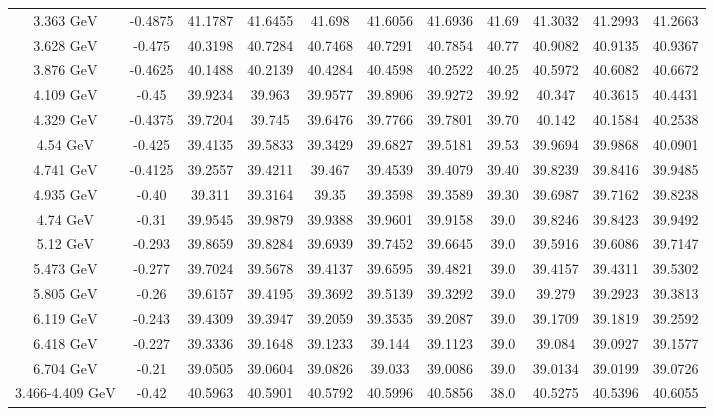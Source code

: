 \documentclass[11pt]{article}
\begin{document}
\begin{table}[htbp]
{\begin{tabular}{ccccccccccc}
				3.363 ${\textrm{GeV}}$ & -0.4875  & 41.1787 & 41.6455 & 41.698 & 41.6056 & 41.6936 & 41.69   & 41.3032 & 41.2993 & 41.2663 \\
				3.628 ${\textrm{GeV}}$ & -0.475  & 40.3198 & 40.7284 & 40.7468 & 40.7291 & 40.7854 & 40.77  & 40.9082 & 40.9135 & 40.9367 \\
				3.876 ${\textrm{GeV}}$ & -0.4625  & 40.1488 & 40.2139 & 40.4284 & 40.4598 & 40.2522 & 40.25  & 40.5972 & 40.6082 & 40.6672 \\
				4.109 ${\textrm{GeV}}$ & -0.45  & 39.9234 & 39.963 & 39.9577 & 39.8906 & 39.9272 & 39.92  & 40.347 & 40.3615 & 40.4431 \\
				4.329 ${\textrm{GeV}}$ & -0.4375  & 39.7204 & 39.745 & 39.6476 & 39.7766 & 39.7801 & 39.70  & 40.142 & 40.1584 & 40.2538 \\
				4.54 ${\textrm{GeV}}$ & -0.425  & 39.4135 & 39.5833 & 39.3429 & 39.6827 & 39.5181 & 39.53   & 39.9694 & 39.9868 & 40.0901 \\
				4.741 ${\textrm{GeV}}$ & -0.4125  & 39.2557 & 39.4211 & 39.467 & 39.4539 & 39.4079 & 39.40  & 39.8239 & 39.8416 & 39.9485 \\
				4.935 ${\textrm{GeV}}$ & -0.40  & 39.311 & 39.3164 & 39.35 & 39.3598 & 39.3589 & 39.30  & 39.6987  & 39.7162 & 39.8238 \\
				\midrule
				4.74 ${\textrm{GeV}}$ & -0.31 & 39.9545 & 39.9879 & 39.9388 & 39.9601 & 39.9158 & 39.0  & 39.8246 & 39.8423 & 39.9492 \\
				5.12 ${\textrm{GeV}}$ & -0.293 & 39.8659 & 39.8284 & 39.6939 & 39.7452 & 39.6645 & 39.0   & 39.5916 & 39.6086 & 39.7147 \\
				5.473 ${\textrm{GeV}}$ & -0.277 & 39.7024 & 39.5678 & 39.4137 & 39.6595 & 39.4821 & 39.0  & 39.4157  & 39.4311 & 39.5302 \\
				5.805 ${\textrm{GeV}}$ & -0.26 & 39.6157 & 39.4195 & 39.3692 & 39.5139 & 39.3292 & 39.0  & 39.279  & 39.2923 & 39.3813 \\
				6.119 ${\textrm{GeV}}$ & -0.243 & 39.4309 & 39.3947 & 39.2059 & 39.3535 & 39.2087 & 39.0  & 39.1709 & 39.1819 & 39.2592 \\
				6.418 ${\textrm{GeV}}$ & -0.227 & 39.3336 & 39.1648 & 39.1233 & 39.144 & 39.1123 & 39.0  & 39.084 & 39.0927 & 39.1577 \\
				6.704 ${\textrm{GeV}}$ & -0.21 & 39.0505 & 39.0604 & 39.0826 & 39.033 & 39.0086 & 39.0  & 39.0134 & 39.0199 & 39.0726 \\
				\midrule
				3.466-4.409 ${\textrm{GeV}}$ & -0.42  & 40.5963 & 40.5901 & 40.5792 & 40.5996 & 40.5856 & 38.0  & 40.5275 & 40.5396 & 40.6055 \\

\end{tabular}}
\end{table}
\end{document}
